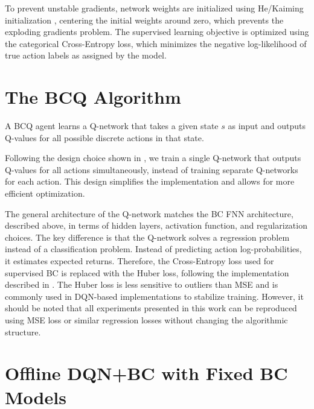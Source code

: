To prevent unstable gradients, network weights are initialized using He/Kaiming initialization \cite{he_initialization_weights}, centering the initial weights around zero, which prevents the exploding gradients problem. The supervised learning objective is optimized using the categorical Cross-Entropy loss, which minimizes the negative log-likelihood of true action labels as assigned by the model.






\section{The BCQ Algorithm}
\label{sec:the_DQN_BC_algorithm}

A BCQ agent learns a Q-network that takes a given state $s$ as input and outputs Q-values for all possible discrete actions in that state.

Following the design choice shown in \cite{BCQ_benchmarking}, we train a single Q-network that outputs Q-values for all actions simultaneously, instead of training separate Q-networks for each action. This design simplifies the implementation and allows for more efficient optimization.


The general architecture of the Q-network matches the BC FNN architecture, described above, in terms of hidden layers, activation function, and regularization choices. The key difference is that the Q-network solves a regression problem instead of a classification problem. Instead of predicting action log-probabilities, it estimates expected returns. Therefore, the Cross-Entropy loss used for supervised BC is replaced with the Huber loss, following the implementation described in \cite{BCQ_benchmarking}. The Huber loss is less sensitive to outliers than MSE and is commonly used in DQN-based implementations to stabilize training. However, it should be noted that all experiments presented in this work can be reproduced using MSE loss or similar regression losses without changing the algorithmic structure.








\section{Offline DQN+BC with Fixed BC Models}
\label{sec:offline_dqn_bc_with_fixed_bc_models}

